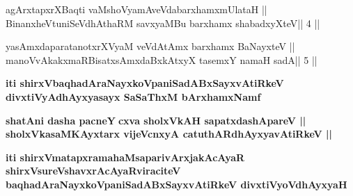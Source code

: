 \begin{shl}
agArxtapxrXBaqti vaMshoV\s yamAveVdabarxhamxmUlataH ||
BinanxheVtuniSeVdhAthaRM savxyaMBu barxhamx shabadxyXteV\hfill || 4 ||
\end{shl}

\begin{shl}
yasAmxdaparatanotxrXV\s yaM veVdAtAmx barxhamx BaNayxteV ||
manoVvAkakxmaRBisatxsAmxdaBxkAtxyX tasemxY namaH sadA\hfill || 5 ||
\end{shl}

\begin{center}
{\bf iti shirxVbaqhadAraNayxkoVpaniSadABxSayxvAtiRkeV\\ 
divxtiVyAdhAyxyasayx SaSaThxM bArxhamxNamf}
\end{center}

\begin{center}
{\bf shatAni dasha pacneY$\;$cxva sholxVkAH sapatxdashApareV ||\\
sholxVkasaMKAyx\s tarx vijeVcnxyA catuthARdhAyxyavAtiRkeV ||}
\end{center}

\begin{center}
{\bf iti shirxVmatapxramahaMsaparivArxjakAcAyaR shirxVsureVshavxrAcAyaRviraciteV\\ 
baqhadAraNayxkoVpaniSadABxSayxvAtiRkeV divxtiVyoV\s dhAyxyaH}
\end{center}


